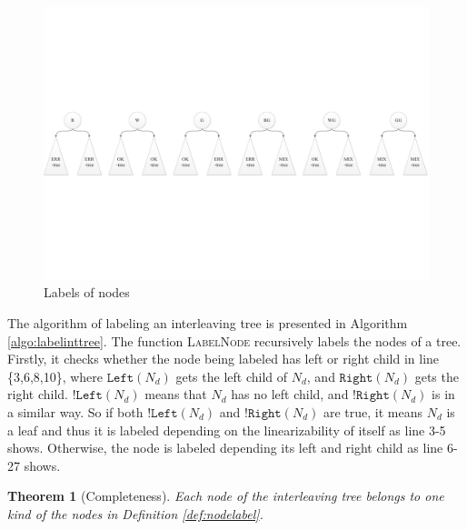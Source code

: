 \documentclass[runningheads]{llncs}
\newtheorem{myTheo}{Theorem}
\begin{document}
\begin{figure}[!ht]
\centering
\includegraphics[width = 4.7in]{label.pdf}
\caption{Labels of nodes}\label{fig:labellabelnodes}
\end{figure}

The algorithm of labeling an interleaving tree is presented in Algorithm \ref{algo:labelinttree}. The function \textsc{LabelNode} recursively labels the nodes of a tree. Firstly, it checks whether the node being labeled has left or right child in line \{3,6,8,10\}, where $\mathtt{Left}(N_d)$ gets the left child of $N_d$, and $\mathtt{Right}(N_d)$ gets the right child. $!\mathtt{Left}(N_d)$ means that $N_d$ has no left child, and $!\mathtt{Right}(N_d)$ is in a similar way. So if both $!\mathtt{Left}(N_d)$ and $!\mathtt{Right}(N_d)$ are true, it means $N_d$ is a leaf and thus it is labeled depending on the linearizability of itself as line 3-5 shows. Otherwise, the node is labeled depending its left and right child as line 6-27 shows.



\begin{myTheo}[Completeness]
    Each node of the interleaving tree belongs to one kind of the nodes in Definition \ref{def:nodelabel}.
\end{myTheo}

\end{document}
